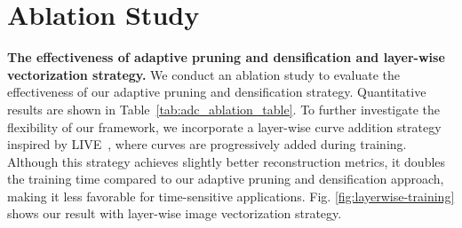 
\appendix


\section{Ablation Study}

\label{sec:ablation}

\noindent\textbf{The effectiveness of adaptive pruning and densification and layer-wise vectorization strategy.}
We conduct an ablation study to evaluate the effectiveness of our adaptive pruning and densification strategy. Quantitative results are shown in Table~\ref{tab:adc_ablation_table}. To further investigate the flexibility of our framework, we incorporate a layer-wise curve addition strategy inspired by LIVE~\cite{xu2022live}, where curves are progressively added during training. Although this strategy achieves slightly better reconstruction metrics, it doubles the training time compared to our adaptive pruning and densification approach, making it less favorable for time-sensitive applications. Fig. \ref{fig:layerwise-training} shows our result with layer-wise image vectorization strategy.


